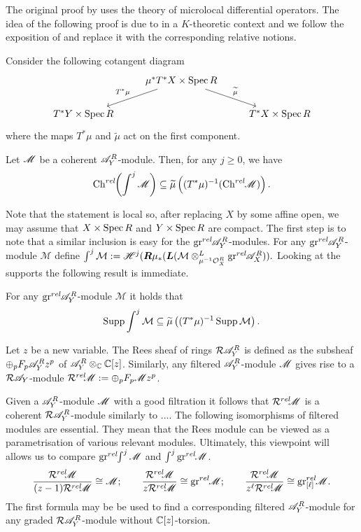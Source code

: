 The original proof by \cite{kashiwara1976b} uses the theory of microlocal differential operators. The idea of the following proof is due to \cite{malgrange1985images} in a $K$-theoretic context and we follow the exposition of \cite{sabbah2011introduction} and replace it with the corresponding relative notions. %

Consider the following cotangent diagram
$$
\begin{tikzcd}
    & \mu^* T^* X\times \Spec R \arrow[swap]{ld}{T^* \mu} \arrow{rd}{\widetilde{\mu}} & \\
    T^* Y\times \Spec R & & T^*X\times \Spec R
\end{tikzcd}
$$
where the maps $T^*\mu$ and $\widetilde{\mu}$ act on the first component.
\begin{theorem}
    Let $\mathscr{M}$ be a coherent $\mathscr{A}_Y^R$-module. Then, for any $j\geq 0$, we have
    $$\operatorname{Ch}^{rel}\mkern-5mu\left(\int^j \mathscr{M} \right)\subseteq  \widetilde{\mu}\left((T^*\mu)^{-1}(\operatorname{Ch}^{rel}\mkern-5mu \mathscr{M}) \right).$$
\end{theorem}
Note that the statement is local so, after replacing $X$ by some affine open, we may assume that $X\times \operatorname{Spec} R$ and $Y\times \operatorname{Spec} R$ are compact.
The first step is to note that a similar inclusion is easy for the $\operatorname{gr}^{rel}\mkern-5mu \mathscr{A}_Y^R$-modules. For any $\operatorname{gr}^{rel}\mkern-5mu \mathscr{A}_Y^R$-module $\mathcal{M}$ define $\int^j \mathcal{M} :=  \mathscr{H}^j(\boldsymbol{R} \mu_* (\boldsymbol{L}( \mathcal{M}\otimes^L_{\mu^{-1}\mathcal{O}_X^R} \operatorname{gr}^{rel}\mkern-5mu \mathscr{A}_X^R)).$
Looking at the supports the following result is immediate.
\begin{lemma}
    For any $\operatorname{gr}^{rel}\mkern-5mu\mathscr{A}_Y^R$-module $\mathcal{M}$ it holds that
    $$\operatorname{Supp} \int^j \mathcal{M}\subseteq \widetilde{\mu}\left((T^* \mu)^{-1} \operatorname{Supp} \mathcal{M}\right).$$
\end{lemma}
\begin{definition}
    Let $z$ be a new variable. The Rees sheaf of rings $\mathcal{R}\mathscr{A}_Y^R$ is defined as the subsheaf $\oplus_p F_p \mathscr{A}_Y^R z^p $ of $\mathscr{A}_Y^R \otimes_{\mathbb{C}} \mathbb{C}[z]$. Similarly, any filtered $\mathscr{A}_Y^R$-module $\mathscr{M}$ gives rise to a $\mathcal{R}\mathscr{A}_Y$-module $\mathcal{R}^{rel}\mkern-5mu\mathscr{M} := \oplus_p F_p \mathscr{M} z^p$.
\end{definition}
Given a $\mathscr{A}_Y^R$-module $\mathscr{M}$ with a good filtration it follows that $\mathcal{R}^{rel}\mkern-5mu\mathscr{M}$ is a coherent $\mathcal{R}\mathscr{A}_Y^R$-module similarly to ....
The following isomorphisms of filtered modules are essential. They mean that the Rees module can be viewed as a parametrisation of various relevant modules. Ultimately, this viewpoint will allows us to compare $\operatorname{gr}^{rel}\mkern-5mu\int^j \mathscr{M}$ and $\int^j \operatorname{gr}^{rel}\mkern-5mu \mathscr{M}$.
$$\frac{\Rrel\M}{(z-1)\Rrel\M} \cong \M; \qquad \frac{\Rrel\M}{z\Rrel\M} \cong \grrel \M;\qquad \frac{\Rrel\M}{z^\ell\Rrel\M} \cong  \grl\M.$$
The first formula may be be used to find a corresponding filtered $\mathscr{A}_Y^R$-module for any graded $\mathcal{R}\mathscr{A}_Y^R$-module without $\mathbb{C}[z]$-torsion.

